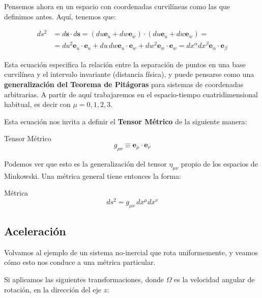 Pensemos ahora en un espacio con coordenadas curvilíneas como las que definimos antes. Aquí, tenemos que:

\begin{equation}
\begin{split}
    d s^2 &= d\mathbf{s} \cdot d\mathbf{s} = (du\mathbf{e}_u+dw\mathbf{e}_w)\cdot(du\mathbf{e}_u+dw\mathbf{e}_w)= \\
    &= du^2 \mathbf{e}_u \cdot \mathbf{e}_u + du\,dw \mathbf{e}_u \cdot \mathbf{e}_w + dw^2 \mathbf{e}_w \cdot \mathbf{e}_w = dx^\alpha dx^\beta \mathbf{e}_\alpha \cdot \mathbf{e}_\beta
\end{split}
\end{equation}

Esta ecuación especifica la relación entre la separación de puntos en una base curvilínea y el intervalo invariante (distancia física), y puede pensarse como una \textbf{generalización del Teorema de Pitágoras} para sistemas de coordenadas arbitrarias. A partir de aquí trabajaremos en el espacio-tiempo cuatridimensional habitual, es decir con $\mu=0,1,2,3$.

Esta ecuación nos invita a definir el \textbf{Tensor Métrico} de la siguiente manera:

\begin{remarkbox}{Tensor Métrico}
\begin{equation}
    g_{\mu\nu}\equiv \mathbf{e}_\mu \cdot \mathbf{e}_\nu
    \label{tensormetricobases}
\end{equation}
\end{remarkbox}

Podemos ver que esto es la generalización del tensor $\eta_{\mu\nu}$ propio de los espacios de Minkowski. Una métrica general tiene entonces la forma:

\begin{remarkbox}{Métrica}
\begin{equation}
    ds^2 = g_{\mu \nu}\,dx^\mu dx^\nu
\end{equation}
\end{remarkbox}

\subsection*{\textbf{Aceleración}}

Volvamos al ejemplo de un sistema no-inercial que rota uniformemente, y veamos cómo esto nos conduce a una métrica particular.

Si aplicamos las siguientes transformaciones, donde $\Omega$ es la velocidad angular de rotación, en la dirección del eje $z$:

